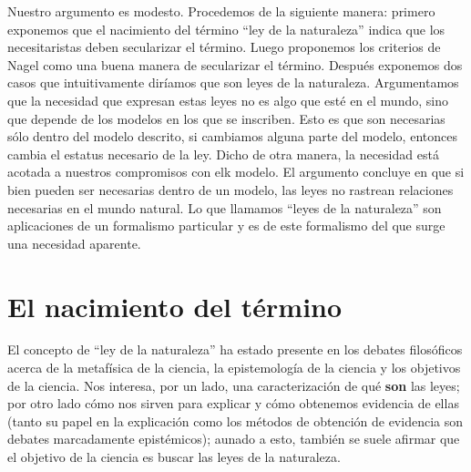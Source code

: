Nuestro argumento es modesto. Procedemos de la siguiente manera: primero exponemos que el nacimiento del término ``ley de la naturaleza'' indica que los necesitaristas deben secularizar el término. Luego proponemos los criterios de Nagel como una buena manera de secularizar el término. Después exponemos dos casos que intuitivamente diríamos que son leyes de la naturaleza. Argumentamos que la necesidad que expresan estas leyes no es algo que esté en el mundo, sino que depende de los modelos en los que se inscriben. Esto es que son necesarias sólo dentro del modelo descrito, si cambiamos alguna parte del modelo, entonces cambia el estatus necesario de la ley. Dicho de otra manera, la necesidad está acotada a nuestros compromisos con elk modelo. El argumento concluye en que si bien pueden ser necesarias dentro de un modelo, las leyes no rastrean relaciones necesarias en el mundo natural. Lo que llamamos ``leyes de la naturaleza'' son aplicaciones de un formalismo particular y es de este formalismo del que surge una necesidad aparente.

\section{El nacimiento del término}

\noindent El concepto de ``ley de la naturaleza'' ha estado presente en los debates filosóficos acerca de la metafísica de la ciencia, la epistemología de la ciencia y los objetivos de la ciencia. Nos interesa, por un lado, una caracterización de qué \textbf{son} las leyes; por otro lado cómo nos sirven para explicar y cómo obtenemos evidencia de ellas (tanto su papel en la explicación como los métodos de obtención de evidencia son debates marcadamente epistémicos); aunado a esto, también se suele afirmar que el objetivo de la ciencia es buscar las leyes de la naturaleza.


